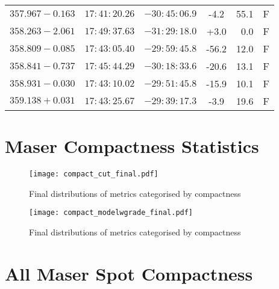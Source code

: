 {\begin{longtable}{lcccrc}
	$357.967-0.163  $&    $17:41:20.26$ &   $-30:45:06.9$  &   -4.2&   55.1&  F  \\
	$358.263-2.061  $&    $17:49:37.63$ &   $-31:29:18.0$  &   +3.0&    0.0&  F  \\
	$358.809-0.085  $&    $17:43:05.40$ &   $-29:59:45.8$  &  -56.2&   12.0&  F  \\
	$358.841-0.737  $&    $17:45:44.29$ &   $-30:18:33.6$  &  -20.6&   13.1&  F  \\
	$358.931-0.030  $&    $17:43:10.02$ &   $-29:51:45.8$  &  -15.9&   10.1&  F  \\
	$359.138+0.031  $&    $17:43:25.67$ &   $-29:39:17.3$  &   -3.9&   19.6&  F  \\
\end{longtable}

}

\clearpage
\section{Maser Compactness Statistics}

\begin{figure}[h]
	\centering
	\texttt{[image: compact\_cut\_final.pdf]}
	\caption[Spot Compactness 1]{Final distributions of metrics categorised by compactness}
	\label{fig:metricsandgradesfinal1}
\end{figure}

\begin{figure}[h]
	\centering
	\texttt{[image: compact\_modelwgrade\_final.pdf]}
	\caption[Spot Compactness 2]{Final distributions of metrics categorised by compactness}
	\label{fig:metricsandgradesfinal2}
\end{figure}

\clearpage
\section{All Maser Spot Compactness}\label{app:allmasercompactness}

